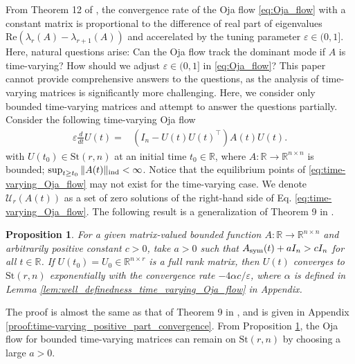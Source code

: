 \documentclass[fleqn,10pt]{SICE_FES26}
\newtheorem{prop}[thm]{Proposition}
\begin{document}
 From Theorem 12 of \cite{TsuzukiOhki2025global}, the convergence rate of the Oja flow \eqref{eq:Oja_flow} with a constant matrix is proportional to the difference of real part of eigenvalues ${\mathrm{Re}} (\lambda _{r}(A) - \lambda _{r+1}(A))$ and accerelated by the tuning parameter $\varepsilon \in (0,1]$. 
    Here, natural questions arise: Can the Oja flow track the dominant mode if $A$ is time-varying? How should we adjust $\varepsilon \in (0,1]$ in \eqref{eq:Oja_flow}? 
    This paper cannot provide comprehensive answers to the questions, as the analysis of time-varying matrices is significantly more challenging.   
    Here, we consider only bounded time-varying matrices and attempt to answer the questions partially.  
    Consider the following time-varying Oja flow
    \begin{align}
    \varepsilon \frac{d}{dt} U(t) = & ( I_{n} - U(t) U(t) ^{\top} ) A(t) U(t) .
    \label{eq:time-varying_Oja_flow}
    \end{align}
    with $U(t_{0}) \in {\mathrm{St}}(r,n)$ at an initial time $t_{0} \in {\mathbb{R}}$, where $A: {\mathbb{R}} \to {\mathbb{R}}^{n\times n}$ is bounded; $\sup _{t \geq t_{0}} \| A(t) \| _{\rm ind} <\infty$.  
    Notice that the equilibrium points of \eqref{eq:time-varying_Oja_flow} may not exist for the time-varying case. 
    We denote ${\mathcal{U}}_{r}(A(t))$ as a set of zero solutions of the right-hand side of Eq. \eqref{eq:time-varying_Oja_flow}. 
    	The following result is a generalization of Theorem 9 in \cite{TsuzukiOhki2025global}. 

	
	\begin{prop}\label{prop:time-varying_positive_part_convergence}
	For a given matrix-valued bounded function $A: {\mathbb{R}} \to {\mathbb{R}}^{n\times n}$ and arbitrarily positive constant $c>0$, take $a>0$ such that $A_{\rm sym}(t) + aI_{n} >cI_{n}$ for all $t\in {\mathbb{R}}$. 
       If $U(t_{0}) = U_{0} \in {\mathbb{R}}^{n\times r}$ is a full rank matrix, then $U(t)$ converges to ${\mathrm{St}}(r,n)$ exponentially with the convergence rate $-4\alpha c/\varepsilon$, where $\alpha$ is defined in Lemma \ref{lem:well_definedness_time_varying_Oja_flow} in Appendix. 
	\end{prop}	
	
	The proof is almost the same as that of Theorem 9 in \cite{TsuzukiOhki2025global}, and is given in Appendix \ref{proof:time-varying_positive_part_convergence}. 
    From Proposition \ref{prop:time-varying_positive_part_convergence}, the Oja flow for bounded time-varying matrices can remain on ${\mathrm{St}}(r,n)$ by choosing a large $a>0$.  
    
\end{document}
